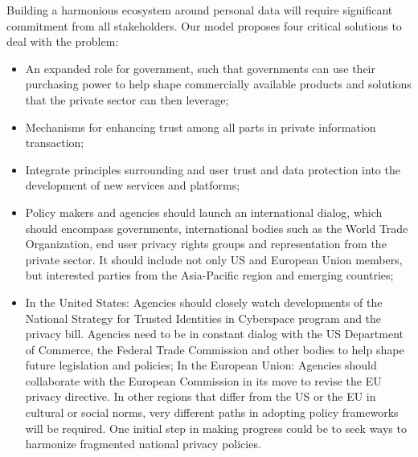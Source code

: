 \documentclass[a4paper,11pt]{texMemo} %
\begin{document}
Building a harmonious ecosystem around personal data will require significant commitment from all stakeholders. Our model proposes four critical solutions to deal with the problem:
\begin{itemize}
\item An expanded role for government, such that governments can use their purchasing power to help shape commercially available products and solutions that the private sector can then leverage;
\item Mechanisms for enhancing trust among all parts in private information transaction;

\item Integrate principles surrounding and user trust and data protection into the development of new services and platforms;
\item Policy makers and agencies should launch an international dialog, which should encompass governments, international bodies such as the World Trade Organization, end user privacy rights groups and representation from the private sector. It should include not only US and European Union members, but interested parties from the Asia-Pacific region and emerging countries;
\item In the United States: Agencies should closely watch developments of the National Strategy for Trusted Identities in Cyberspace program and the privacy bill. Agencies need to be in constant dialog with the US Department of Commerce, the Federal Trade Commission and other bodies to help shape future legislation and policies; In the European Union: Agencies should collaborate with the European Commission in its move to revise the EU privacy directive. In other regions that differ from the US or the EU in cultural or social norms, very different paths in adopting policy frameworks will be required. One initial step in making progress could be to seek ways to harmonize fragmented national privacy policies.
\end{itemize}

\end{document}
